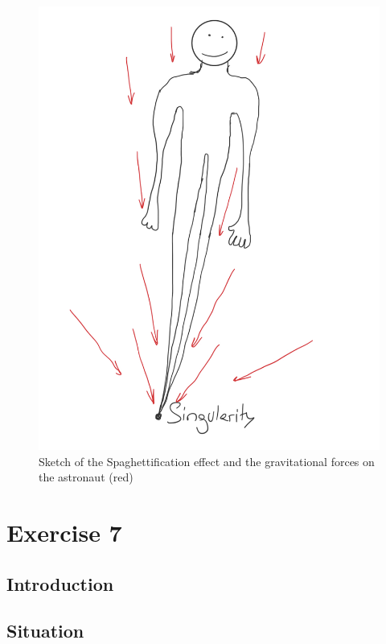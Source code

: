 \documentclass[reprint,english,notitlepage]{revtex4-2}
\begin{document}
        \begin{figure}[h]
            \centering
            \includegraphics[scale=0.15]{spaghettification}
            \caption{Sketch of the Spaghettification effect and the gravitational forces on the astronaut (red)}\label{fig:spaghettification}
        \end{figure}


\newpage
\section{Exercise 7}\label{sec:exercise-7}
    \subsection{Introduction}\label{subsec:introduction7}
    \subsection{Situation}\label{subsec:situation7}
\end{document}
